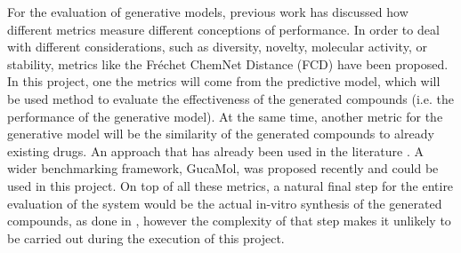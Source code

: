 \documentclass{article}
\begin{document}
For the evaluation of generative models, previous work \cite{Theis2016} has discussed how
different metrics measure different conceptions of performance. In order to deal with
different considerations, such as diversity, novelty, molecular activity, or stability,
metrics like the Fréchet ChemNet Distance (FCD) \cite{Preuer} have been proposed. In
this project, one the metrics will come from the predictive model, which will be used
method to evaluate the effectiveness of the generated compounds (i.e. the performance of
the generative model). At the same time, another metric for the generative model will be
the similarity of the generated compounds to already existing drugs. An approach that
has already been used in the literature \cite{Born2019}. A wider benchmarking framework,
GucaMol, was proposed recently \cite{Brown2019} and could be used in this project. On
top of all these metrics, a natural final step for the entire evaluation of the system
would be the actual in-vitro synthesis of the generated compounds, as done in
\cite{Zhavoronkov2019}, however the complexity of that step makes it unlikely to be
carried out during the execution of this project. 









    
\end{document}
